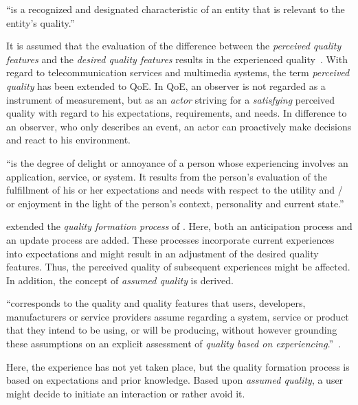 \begin{definition}
``is a recognized and designated characteristic of an entity that is relevant to the entity's quality.''~\citep[][p.\,17]{jekosch_voice_2005}
\end{definition}

It is assumed that the evaluation of the difference between the \emph{perceived quality features} and the \emph{desired quality features} results in the experienced quality~\citep[p.\,23]{raake_quality_2014}.
With regard to telecommunication services and multimedia systems, the term \emph{perceived quality} has been extended to \acf{QoE}.
In \ac{QoE}, an observer is not regarded as a instrument of measurement, but as an \emph{actor} striving for a \emph{satisfying} perceived quality with regard to his expectations, requirements, and needs.
In difference to an observer, who only describes an event, an actor can proactively make decisions and react to his environment.  

\begin{definition}
``is the degree of delight or annoyance of a person whose experiencing involves an application, service, or system.
It results from the person’s evaluation of the fulfillment of his or her expectations and needs with respect to the utility and / or enjoyment in the light of the person’s context, personality and current state.''~\citep[][p.\,19]{raake_quality_2014}
\end{definition}

\citet{raake_quality_2014} extended the \emph{quality formation process} of \citet{jekosch_voice_2005}.
Here, both an anticipation process and an update process are added.
These processes incorporate current experiences into expectations and might result in an adjustment of the desired quality features.
Thus, the perceived quality of subsequent experiences might be affected.
In addition, the concept of \emph{assumed quality} is derived.
\begin{definition}\label{def:assumedquality}
``corresponds to the quality and quality features that users, developers, manufacturers or service providers assume regarding a system, service or product that they intend to be using, or will be producing, without however grounding these assumptions on an explicit assessment of \textit{quality based on experiencing}.''~\citep[][p.\,17]{raake_quality_2014}.
\end{definition}
Here, the experience has not yet taken place, but the quality formation process is based on expectations and prior knowledge.
Based upon \emph{assumed quality}, a user might decide to initiate an interaction or rather avoid it.

